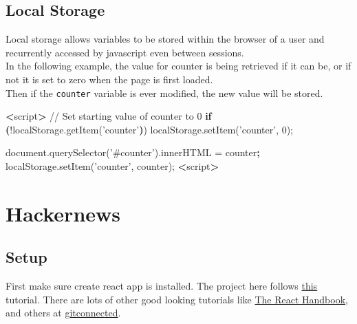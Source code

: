 \documentclass[]{book}
\newenvironment{Shaded}{\begin{snugshade}}{\end{snugshade}}
\newcommand{\ExtensionTok}[1]{#1}
\newcommand{\KeywordTok}[1]{\textcolor[rgb]{0.13,0.29,0.53}{\textbf{#1}}}
\newcommand{\NormalTok}[1]{#1}
\newcommand{\OperatorTok}[1]{\textcolor[rgb]{0.81,0.36,0.00}{\textbf{#1}}}
\newcommand{\StringTok}[1]{\textcolor[rgb]{0.31,0.60,0.02}{#1}}
\begin{document}
\hypertarget{local-storage}{%
\section{Local Storage}\label{local-storage}}

Local storage allows variables to be stored within the browser of a user and recurrently accessed by javascript even between sessions.\\
In the following example, the value for counter is being retrieved if it can be, or if not it is set to zero when the page is first loaded.\\
Then if the \texttt{counter} variable is ever modified, the new value will be stored.

\begin{Shaded}
\begin{Highlighting}[]
\OperatorTok{<}\ExtensionTok{script}\OperatorTok{>}
    \ExtensionTok{//}\NormalTok{ Set starting value of counter to 0  }
    \KeywordTok{if} \KeywordTok{(}\NormalTok{!}\ExtensionTok{localStorage.getItem}\NormalTok{(}\StringTok{'counter'}\KeywordTok{)}\NormalTok{)  }
        \ExtensionTok{localStorage.setItem}\NormalTok{(}\StringTok{'counter'}\NormalTok{, 0);}

    \ExtensionTok{document.querySelector}\NormalTok{(}\StringTok{'#counter'}\NormalTok{)}\ExtensionTok{.innerHTML}\NormalTok{ = counter}\KeywordTok{;}
    \ExtensionTok{localStorage.setItem}\NormalTok{(}\StringTok{'counter'}\NormalTok{, counter);}
\OperatorTok{<}\ExtensionTok{script}\OperatorTok{>}
\end{Highlighting}
\end{Shaded}

\hypertarget{hackernews}{%
\chapter{Hackernews}\label{hackernews}}

\hypertarget{setup-1}{%
\section{Setup}\label{setup-1}}

First make sure create react app is installed. The project here follows \href{https://www.youtube.com/watch?v=oGB_VPrld0U\&list=PLTTC1K14KAxHj6AftnRUD28SQaoVauvl3}{this} tutorial. There are lots of other good looking tutorials like \href{https://www.freecodecamp.org/news/the-react-handbook-b71c27b0a795/}{The React Handbook}, and others at \href{https://gitconnected.com/learn/react}{gitconnected}.
\end{document}

